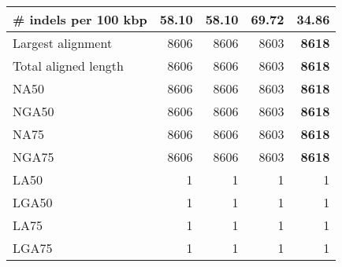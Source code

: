 \documentclass[12pt,a4paper]{article}
\begin{document}
\begin{table}[ht]
\begin{center}
\begin{tabular}{|l*{4}{|r}|}
\# indels per 100 kbp & 58.10 & 58.10 & 69.72 & {\bf 34.86} \\ \hline
Largest alignment & 8606 & 8606 & 8603 & {\bf 8618} \\ \hline
Total aligned length & 8606 & 8606 & 8603 & {\bf 8618} \\ \hline
NA50 & 8606 & 8606 & 8603 & {\bf 8618} \\ \hline
NGA50 & 8606 & 8606 & 8603 & {\bf 8618} \\ \hline
NA75 & 8606 & 8606 & 8603 & {\bf 8618} \\ \hline
NGA75 & 8606 & 8606 & 8603 & {\bf 8618} \\ \hline
LA50 & 1 & 1 & 1 & 1 \\ \hline
LGA50 & 1 & 1 & 1 & 1 \\ \hline
LA75 & 1 & 1 & 1 & 1 \\ \hline
LGA75 & 1 & 1 & 1 & 1 \\ \hline
\end{tabular}
\end{center}
\end{table}
\end{document}
